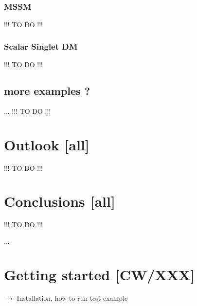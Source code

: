\subsubsection{MSSM}
\smallskip
{\color{red} !!! TO DO !!!}
\smallskip


\subsubsection{Scalar Singlet DM}
\smallskip
{\color{red} !!! TO DO !!!}
\smallskip


\subsection{more examples ?}
...
\smallskip
{\color{red} !!! TO DO !!!}
\smallskip



\section{Outlook {\bf [all]}}
\label{out}
\smallskip
{\color{red} !!! TO DO !!!}
\smallskip



\section{Conclusions {\bf [all]} }
\label{conc}
\smallskip
{\color{red} !!! TO DO !!!}
\smallskip




\begin{acknowledgements}
...
\end{acknowledgements}



\appendix
\label{}

\section{Getting started  {\bf [CW/XXX]}}
\label{code_init}

$\to$ Installation, how to run test example

